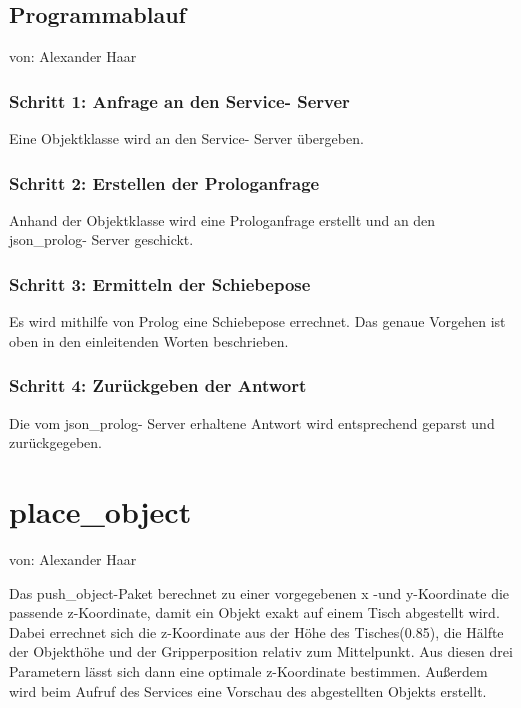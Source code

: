 \documentclass{suturo}
\makeatletter
\newcommand{\chapterauthor}[1]{%
  {\parindent0pt\vspace*{-27pt}%
  \linespread{0}\small\begin{flushright}von: #1\end{flushright}%
  \par\nobreak\vspace*{0pt}}
  \@afterheading%
}
\makeatother
\begin{document}
\subsection{Programmablauf}
\chapterauthor{Alexander Haar}
\subsubsection{Schritt 1: Anfrage an den Service- Server}
Eine Objektklasse wird an den Service- Server übergeben.
\subsubsection{Schritt 2: Erstellen der Prologanfrage}
Anhand der Objektklasse wird eine Prologanfrage erstellt und an den json\_prolog- Server geschickt.
\subsubsection{Schritt 3: Ermitteln der Schiebepose} 
Es wird mithilfe von Prolog eine Schiebepose errechnet. Das genaue Vorgehen ist oben in den einleitenden Worten beschrieben.
\subsubsection{Schritt 4: Zurückgeben der Antwort}
Die vom json\_prolog- Server erhaltene Antwort wird entsprechend geparst und zurückgegeben.

\section{place\_object}
\chapterauthor{Alexander Haar}
Das push\_object-Paket berechnet zu einer vorgegebenen x -und y-Koordinate die passende z-Koordinate, damit ein Objekt exakt auf einem Tisch abgestellt wird. Dabei errechnet sich die z-Koordinate aus der Höhe des Tisches(0.85), die Hälfte der Objekthöhe und der Gripperposition relativ zum Mittelpunkt. Aus diesen drei Parametern lässt sich dann eine optimale z-Koordinate bestimmen. Außerdem wird beim Aufruf des Services eine Vorschau des abgestellten Objekts erstellt.

\begin{figure}[!htb]
\end{figure}
      
\end{document}
